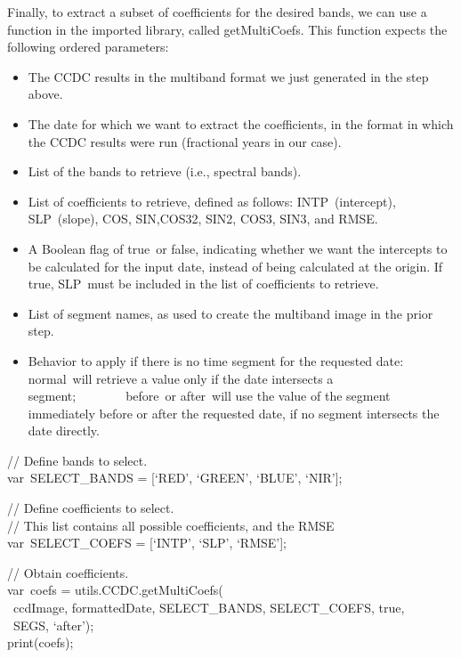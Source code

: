 \documentclass[
  letterpaper,
  DIV=11,
  numbers=noendperiod]{scrreprt}
\providecommand{\tightlist}{%
  \setlength{\itemsep}{0pt}\setlength{\parskip}{0pt}}\usepackage{longtable,booktabs,array}
\begin{document}
Finally, to extract a subset of coefficients for the desired bands, we
can use a function in the imported library, called getMultiCoefs. This
function expects the following ordered parameters:

\begin{itemize}
\tightlist
\item
  The CCDC results in the multiband format we just generated in the step
  above.
\item
  The date for which we want to extract the coefficients, in the format
  in which the CCDC results were run (fractional years in our case).
\item
  List of the bands to retrieve (i.e., spectral bands).
\item
  List of coefficients to retrieve, defined as follows:
  INTP~(intercept), SLP~(slope), COS, SIN,COS32, SIN2, COS3, SIN3, and
  RMSE.
\item
  A Boolean flag of true~or false, indicating whether we want the
  intercepts to be calculated for the input date, instead of being
  calculated at the origin. If true, SLP~must be included in the list of
  coefficients to retrieve.
\item
  List of segment names, as used to create the multiband image in the
  prior step.
\item
  Behavior to apply if there is no time segment for the requested date:
  normal~will retrieve a value only if the date intersects a
  segment;~~~~~~~~before~or after~will use the value of the segment
  immediately before or after the requested date, if no segment
  intersects the date directly.
\end{itemize}

// Define bands to select.\\
var~SELECT\_BANDS = {[}`RED', `GREEN', `BLUE', `NIR'{]};

// Define coefficients to select.\\
// This list contains all possible coefficients, and the RMSE\\
var~SELECT\_COEFS = {[}`INTP', `SLP', `RMSE'{]};

// Obtain coefficients.\\
var~coefs = utils.CCDC.getMultiCoefs(\\
\hspace*{0.333em} ~ccdImage, formattedDate, SELECT\_BANDS,
SELECT\_COEFS, true,\\
\hspace*{0.333em} ~SEGS, `after');\\
print(coefs);
\end{document}
